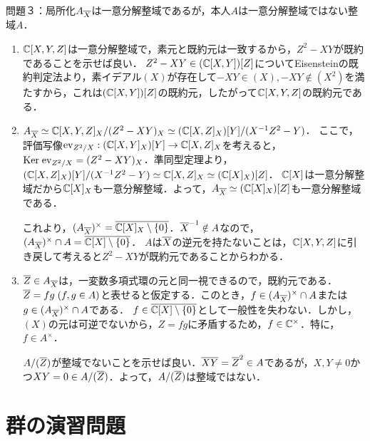 \documentclass[uplatex,dvipdfmx]{jsreport}
\begin{document}
問題３：局所化$A_{\overline{X}}$は一意分解整域であるが，本人$A$は一意分解整域ではない整域$A$．
\begin{enumerate}
    \item $\mathbb{C}[X,Y,Z]$は一意分解整域で，素元と既約元は一致するから，$Z^2-XY$が既約であることを示せば良い．
    $Z^2-XY\in(\mathbb{C}[X,Y])[Z]$についてEisensteinの既約判定法より，素イデアル$(X)$が存在して$-XY\in(X),-XY\notin (X^2)$を満たすから，これは$(\mathbb{C}[X,Y])[Z]$の既約元，したがって$\mathbb{C}[X,Y,Z]$の既約元である．
    \item $A_{\overline{X}}\simeq\mathbb{C}[X,Y,Z]_X/(Z^2-XY)_X\simeq(\mathbb{C}[X,Z]_X)[Y]/(X^{-1}Z^2-Y)$．
    ここで，評価写像$\mathrm{ev}_{Z^2/X}:(\mathbb{C}[X,Y]_X)[Y]\to\mathbb{C}[X,Z]_X$を考えると，$\mathrm{Ker}\;\mathrm{ev}_{Z^2/X}=(Z^2-XY)_X$．準同型定理より，$(\mathbb{C}[X,Z]_X)[Y]/(X^{-1}Z^2-Y)\simeq\mathbb{C}[X,Z]_X\simeq(\mathbb{C}[X]_X)[Z]$．
    $\mathbb{C}[X]$は一意分解整域だから$\mathbb{C}[X]_X$も一意分解整域．よって，$A_{\overline{X}}\simeq(\mathbb{C}[X]_X)[Z]$も一意分解整域である．

    これより，$(A_{\overline{X}})^\times=\overline{\mathbb{C}[X]_X\setminus\{0\}}$．$\overline{X}^{-1}\notin A$なので，$(A_{\overline{X}})^\times\cap A=\overline{\mathbb{C}[X]\setminus\{0\}}$．
    $A$は$\overline{X}$の逆元を持たないことは，$\mathbb{C}[X,Y,Z]$に引き戻して考えると$Z^2-XY$が既約元であることからわかる．
    \item $\overline{Z}\in A_{\overline{X}}$は，一変数多項式環の元と同一視できるので，既約元である．
    $\overline{Z}=fg\;(f,g\in A)$と表せると仮定する．このとき，$f\in (A_{\overline{X}})^\times\cap A$または$g\in (A_{\overline{X}})^\times\cap A$である．
    $f\in\overline{\mathbb{C}[X]\setminus\{0\}}$として一般性を失わない．しかし，$(X)$の元は可逆でないから，$Z=fg$に矛盾するため，$f\in\mathbb{C}^\times$．特に，$f\in A^\times$．
    
    $A/(\overline{Z})$が整域でないことを示せば良い．$\overline{XY}=\overline{Z}^2\in A$であるが，$X,Y\ne 0$かつ$XY=0\in A/(\overline{Z})$．よって，$A/(\overline{Z})$は整域ではない．
\end{enumerate}

\section{群の演習問題}
\end{document}
